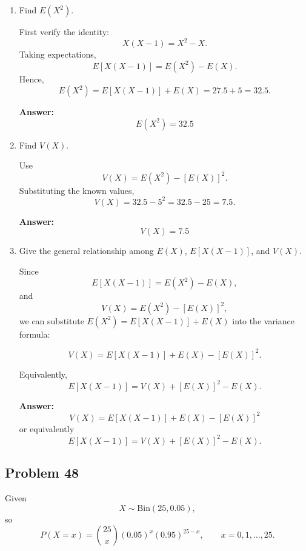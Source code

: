 \documentclass[11pt]{article}
\begin{document}
\begin{enumerate}
    \item[(a)] Find \(E(X^2)\).

    First verify the identity:
    \[
    X(X-1)=X^2-X.
    \]
    Taking expectations,
    \[
    E[X(X-1)]=E(X^2)-E(X).
    \]
    Hence,
    \[
    E(X^2)=E[X(X-1)]+E(X)=27.5+5=32.5.
    \]

    \textbf{Answer:}
    \[
    \boxed{E(X^2)=32.5}
    \]

    \item[(b)] Find \(V(X)\).

    Use
    \[
    V(X)=E(X^2)-[E(X)]^2.
    \]
    Substituting the known values,
    \[
    V(X)=32.5-5^2=32.5-25=7.5.
    \]

    \textbf{Answer:}
    \[
    \boxed{V(X)=7.5}
    \]

    \item[(c)] Give the general relationship among \(E(X)\), \(E[X(X-1)]\), and \(V(X)\).

    Since
    \[
    E[X(X-1)]=E(X^2)-E(X),
    \]
    and
    \[
    V(X)=E(X^2)-[E(X)]^2,
    \]
    we can substitute \(E(X^2)=E[X(X-1)]+E(X)\) into the variance formula:

    \[
    V(X)=E[X(X-1)]+E(X)-[E(X)]^2.
    \]

    Equivalently,
    \[
    E[X(X-1)]=V(X)+[E(X)]^2-E(X).
    \]

    \textbf{Answer:}
    \[
    \boxed{V(X)=E[X(X-1)]+E(X)-[E(X)]^2}
    \]
    or equivalently
    \[
    \boxed{E[X(X-1)]=V(X)+[E(X)]^2-E(X)}.
    \]
\end{enumerate}

\subsection*{Problem 48}

Given
\[
X \sim \mathrm{Bin}(25,0.05),
\]
so
\[
P(X=x)=\binom{25}{x}(0.05)^x(0.95)^{25-x}, \qquad x=0,1,\dots,25.
\]
\end{document}
